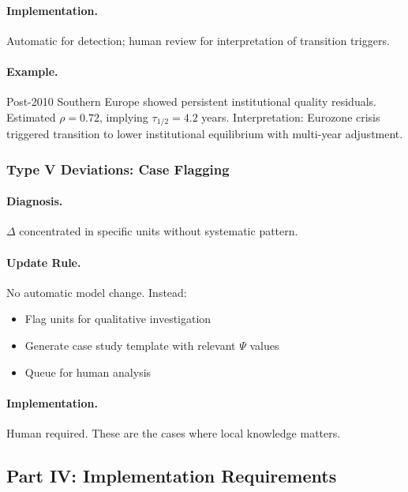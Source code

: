 \paragraph{Implementation.}
Automatic for detection; human review for interpretation of transition triggers.

\paragraph{Example.}
Post-2010 Southern Europe showed persistent institutional quality residuals. 
Estimated $\rho = 0.72$, implying $\tau_{1/2} = 4.2$ years. Interpretation: 
Eurozone crisis triggered transition to lower institutional equilibrium with 
multi-year adjustment.

\subsubsection{Type V Deviations: Case Flagging}

\paragraph{Diagnosis.}
$\Delta$ concentrated in specific units without systematic pattern.

\paragraph{Update Rule.}
No automatic model change. Instead:
\begin{itemize}
    \item Flag units for qualitative investigation
    \item Generate case study template with relevant $\Psi$ values
    \item Queue for human analysis
\end{itemize}

\paragraph{Implementation.}
Human required. These are the cases where local knowledge matters.

\subsection{Part IV: Implementation Requirements}

